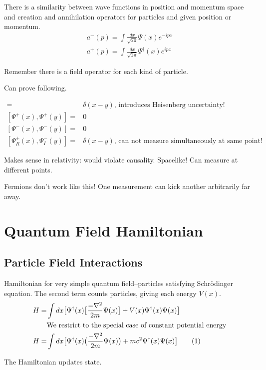 \documentclass[]{article}
\newcommand\numberthis{\addtocounter{equation}{1}\tag{\theequation}}
\begin{document}
There is a similarity between wave functions in position and momentum space and creation and annihilation operators for particles and given position or momentum.
\begin{align*}
a^-(p) = \int \frac{dx}{\sqrt{2\pi}} \Psi(x) e^{-ipx}\\
a^+(p) = \int \frac{dx}{\sqrt{2\pi}} \Psi^\dagger(x) e^{ipx}
\end{align*}

Remember there is a field operator for each kind of particle.

Can prove following.
 
\begin{align*}
[\Psi^+(x),\Psi^-(y)] =& \delta(x-y) \text{, introduces Heisenberg uncertainty!}\\
[\Psi^+(x),\Psi^+(y)] =&0\\
[\Psi^-(x),\Psi^-(y)] =&0\\
[\Psi^+_R(x),\Psi^-_I(y)] =& \delta(x-y) \text{, can not measure simultaneously at same point!}
\end{align*}

Makes sense in relativity: would violate causality. Spacelike! Can measure at different points.

Fermions don't work like this! One measurement can kick another arbitrarily far away.

\section{Quantum Field Hamiltonian}

\subsection{Particle Field Interactions}

Hamiltonian for very simple quantum field--particles satisfying Schr\"odinger equation. The second term counts particles, giving each energy $V(x)$.
\begin{align*}
H =& \int dx \big[ \Psi^\dagger(x) \big[\frac{- \nabla^2}{2m} \Psi(x) \big]+ V(x) \Psi^\dagger(x) \Psi(x) \big] \\
&\text{We restrict to the special case of constant potential energy}\\
H=&\int dx \big[\Psi^\dagger(x) \big(\frac{- \nabla^2}{2m} \Psi(x)\big) + mc^2 \Psi^\dagger(x) \Psi(x)\big]  \numberthis\label{eq:psi_mc2}
\end{align*}

The Hamiltonian updates state.
\end{document}
